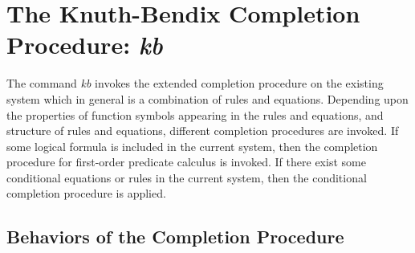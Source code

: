 \section{The Knuth-Bendix Completion Procedure: \em kb}

The command {\em kb} invokes the extended completion procedure on the
existing system which in general is a combination of rules and
equations.  Depending upon the properties of function symbols
appearing in the rules and equations, and structure of rules and
equations, different completion procedures are invoked.  If some
logical formula is included in the current system, then the completion
procedure for first-order predicate calculus is invoked.  If there
exist some conditional equations or rules in the current system, then
the conditional completion procedure is applied.
  
\subsection{Behaviors of the Completion Procedure}

